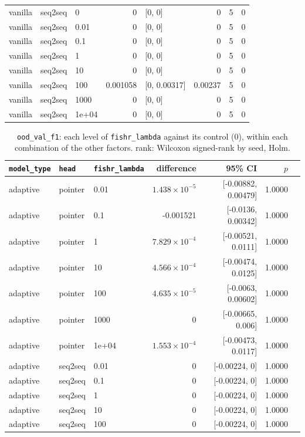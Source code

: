 \documentclass[10pt]{article}
\begin{document}
{\begin{longtable}{lllrlrrr}
vanilla & seq2seq & 0 & 0 & [0, 0] & 0 & 5 & 0\\
vanilla & seq2seq & 0.01 & 0 & [0, 0] & 0 & 5 & 0\\
vanilla & seq2seq & 0.1 & 0 & [0, 0] & 0 & 5 & 0\\
vanilla & seq2seq & 1 & 0 & [0, 0] & 0 & 5 & 0\\
vanilla & seq2seq & 10 & 0 & [0, 0] & 0 & 5 & 0\\
vanilla & seq2seq & 100 & 0.001058 & [0, 0.00317] & 0.00237 & 5 & 0\\
vanilla & seq2seq & 1000 & 0 & [0, 0] & 0 & 5 & 0\\
vanilla & seq2seq & 1e+04 & 0 & [0, 0] & 0 & 5 & 0\\
\bottomrule
\end{longtable}
}

{\small
\begin{longtable}{lllrrrl}
\caption{\texttt{ood\_val\_f1}: each level of \texttt{fishr\_lambda} against its control (0), within each combination of the other factors. rank: Wilcoxon signed-rank by seed, Holm.}\label{tab:control-ood_val_f1}\\
\toprule
\texttt{model\_type} & \texttt{head} & \texttt{fishr\_lambda} & difference & 95\% CI & $p$ & \\
\midrule
\endhead
adaptive & pointer & 0.01 & $1.438\times10^{-5}$ & [-0.00882, 0.00479] & 1.0000 & \\
adaptive & pointer & 0.1 & -0.001521 & [-0.0136, 0.00342] & 1.0000 & \\
adaptive & pointer & 1 & $7.829\times10^{-4}$ & [-0.00521, 0.0111] & 1.0000 & \\
adaptive & pointer & 10 & $4.566\times10^{-4}$ & [-0.00474, 0.0125] & 1.0000 & \\
adaptive & pointer & 100 & $4.635\times10^{-5}$ & [-0.0063, 0.00602] & 1.0000 & \\
adaptive & pointer & 1000 & 0 & [-0.00665, 0.006] & 1.0000 & \\
adaptive & pointer & 1e+04 & $1.553\times10^{-4}$ & [-0.00473, 0.0117] & 1.0000 & \\
adaptive & seq2seq & 0.01 & 0 & [-0.00224, 0] & 1.0000 & \\
adaptive & seq2seq & 0.1 & 0 & [-0.00224, 0] & 1.0000 & \\
adaptive & seq2seq & 1 & 0 & [-0.00224, 0] & 1.0000 & \\
adaptive & seq2seq & 10 & 0 & [-0.00224, 0] & 1.0000 & \\
adaptive & seq2seq & 100 & 0 & [-0.00224, 0] & 1.0000 & \\

\end{longtable}}
\end{document}
